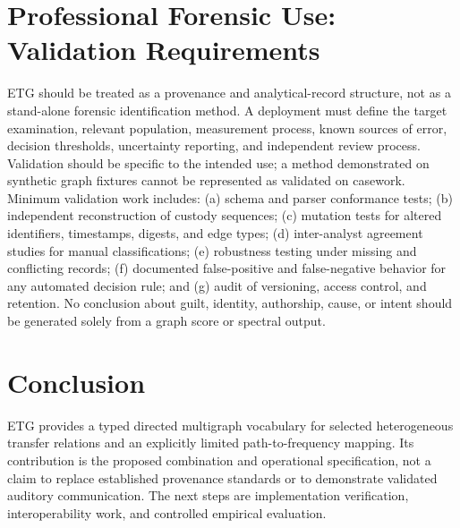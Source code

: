 \documentclass[11pt]{article}
\begin{document}
\section{Professional Forensic Use: Validation Requirements}
ETG should be treated as a provenance and analytical-record structure, not as a stand-alone forensic identification method. A deployment must define the target examination, relevant population, measurement process, known sources of error, decision thresholds, uncertainty reporting, and independent review process. Validation should be specific to the intended use; a method demonstrated on synthetic graph fixtures cannot be represented as validated on casework.
Minimum validation work includes: (a) schema and parser conformance tests; (b) independent reconstruction of custody sequences; (c) mutation tests for altered identifiers, timestamps, digests, and edge types; (d) inter-analyst agreement studies for manual classifications; (e) robustness testing under missing and conflicting records; (f) documented false-positive and false-negative behavior for any automated decision rule; and (g) audit of versioning, access control, and retention. No conclusion about guilt, identity, authorship, cause, or intent should be generated solely from a graph score or spectral output.
\section{Conclusion}
ETG provides a typed directed multigraph vocabulary for selected heterogeneous transfer relations and an explicitly limited path-to-frequency mapping. Its contribution is the proposed combination and operational specification, not a claim to replace established provenance standards or to demonstrate validated auditory communication. The next steps are implementation verification, interoperability work, and controlled empirical evaluation.
\printbibliography
\end{document}

